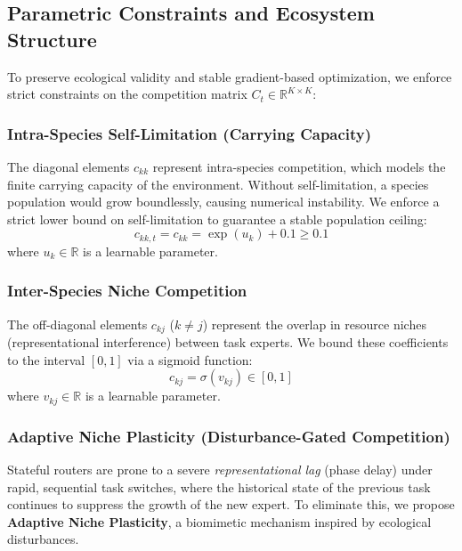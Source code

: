 \subsection{Parametric Constraints and Ecosystem Structure}
To preserve ecological validity and stable gradient-based optimization, we enforce strict constraints on the competition matrix $C_t \in \mathbb{R}^{K \times K}$:

\subsubsection{Intra-Species Self-Limitation (Carrying Capacity)}
The diagonal elements $c_{kk}$ represent intra-species competition, which models the finite carrying capacity of the environment. Without self-limitation, a species population would grow boundlessly, causing numerical instability. We enforce a strict lower bound on self-limitation to guarantee a stable population ceiling:
\begin{equation}
    c_{kk, t} = c_{kk} = \exp(u_k) + 0.1 \ge 0.1
\end{equation}
where $u_k \in \mathbb{R}$ is a learnable parameter.

\subsubsection{Inter-Species Niche Competition}
The off-diagonal elements $c_{kj}$ ($k \neq j$) represent the overlap in resource niches (representational interference) between task experts. We bound these coefficients to the interval $[0, 1]$ via a sigmoid function:
\begin{equation}
    c_{kj} = \sigma(v_{kj}) \in [0, 1]
\end{equation}
where $v_{kj} \in \mathbb{R}$ is a learnable parameter.

\subsubsection{Adaptive Niche Plasticity (Disturbance-Gated Competition)}
Stateful routers are prone to a severe \emph{representational lag} (phase delay) under rapid, sequential task switches, where the historical state of the previous task continues to suppress the growth of the new expert. To eliminate this, we propose \textbf{Adaptive Niche Plasticity}, a biomimetic mechanism inspired by ecological disturbances.

